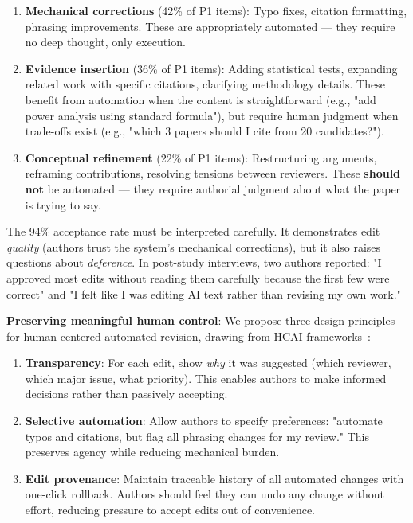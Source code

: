 \begin{enumerate}
\item \textbf{Mechanical corrections} (42\% of P1 items): Typo fixes, citation formatting, phrasing improvements. These are appropriately automated — they require no deep thought, only execution.

\item \textbf{Evidence insertion} (36\% of P1 items): Adding statistical tests, expanding related work with specific citations, clarifying methodology details. These benefit from automation when the content is straightforward (e.g., "add power analysis using standard formula"), but require human judgment when trade-offs exist (e.g., "which 3 papers should I cite from 20 candidates?").

\item \textbf{Conceptual refinement} (22\% of P1 items): Restructuring arguments, reframing contributions, resolving tensions between reviewers. These \textbf{should not} be automated — they require authorial judgment about what the paper is trying to say.
\end{enumerate}

The 94\% acceptance rate must be interpreted carefully. It demonstrates edit \textit{quality} (authors trust the system's mechanical corrections), but it also raises questions about \textit{deference}. In post-study interviews, two authors reported: "I approved most edits without reading them carefully because the first few were correct" and "I felt like I was editing AI text rather than revising my own work."

\textbf{Preserving meaningful human control}: We propose three design principles for human-centered automated revision, drawing from HCAI frameworks~\cite{shneiderman2020human,amershi2019guidelines}:

\begin{enumerate}
\item \textbf{Transparency}: For each edit, show \textit{why} it was suggested (which reviewer, which major issue, what priority). This enables authors to make informed decisions rather than passively accepting.

\item \textbf{Selective automation}: Allow authors to specify preferences: "automate typos and citations, but flag all phrasing changes for my review." This preserves agency while reducing mechanical burden.

\item \textbf{Edit provenance}: Maintain traceable history of all automated changes with one-click rollback. Authors should feel they can undo any change without effort, reducing pressure to accept edits out of convenience.
\end{enumerate}

